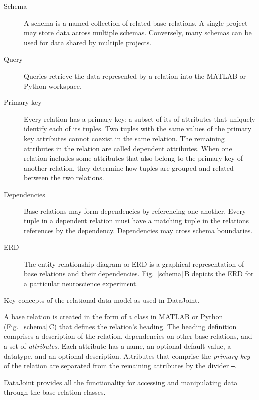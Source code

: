 \documentclass[10pt,letterpaper]{article}
\begin{document}
\begin{table}
\begin{boxedminipage}{\textwidth}
\begin{description}
\item[Schema] A schema is a named collection of related base relations. 
A single project may store data across multiple schemas. Conversely, many schemas can be used for data shared by multiple projects.

\item[Query] Queries retrieve the data represented by a relation into the MATLAB or Python workspace.

\item[Primary key] Every relation has a primary key: a subset of its of attributes that uniquely identify each of its tuples. 
Two tuples with the same values of the primary key attributes cannot coexist in the same relation.
The remaining attributes in the relation are called dependent attributes. 
When one relation includes some attributes that also belong to the primary key of another relation, they determine how tuples are grouped and related between the two relations.

\item[Dependencies]
Base relations may form dependencies by referencing one another. 
Every tuple in a dependent relation must have a matching tuple in the relations references by the dependency. 
Dependencies may cross schema boundaries.

\item[ERD]
The entity relationship diagram or ERD is a graphical representation of base relations and their dependencies.
Fig.\ \ref{schema}\,B depicts the ERD for a particular neuroscience experiment. 
\end{description}
\end{boxedminipage}
\caption{Key concepts of the relational data model as used in DataJoint.}
\label{glossary}
\end{table}

A base relation is created in the form of a class in MATLAB or Python (Fig.\ \ref{schema}\,C) that defines the relation's heading.
The heading definition comprises a description of the relation, dependencies on other base relations, and a set of \emph{attributes}. 
Each attribute has a name, an optional default value, a datatype, and an optional description.
Attributes that comprise the \emph{primary key} of the relation are separated from the remaining attributes by the divider {\tt---}.

DataJoint provides all the functionality for accessing and manipulating data through the base relation classes. 
\end{document}
